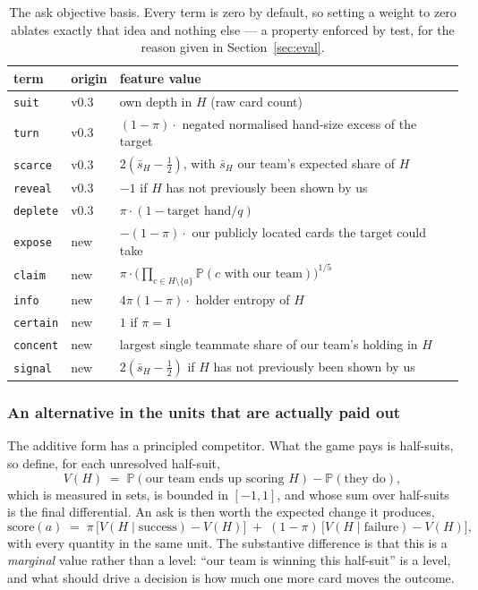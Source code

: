 \documentclass[11pt,letterpaper]{article}
\newcommand{\Prob}{\ensuremath{\mathbb{P}}}
\begin{document}
\begin{table}[t]
\centering
\small
\begin{tabular}{llp{7.4cm}}
\toprule
term & origin & feature value \\
\midrule
\texttt{suit}    & v0.3 & own depth in $H$ (raw card count) \\
\texttt{turn}    & v0.3 & $(1-\pi) \cdot$ negated normalised hand-size excess of the target \\
\texttt{scarce}  & v0.3 & $2(\bar{s}_H - \tfrac12)$, with $\bar{s}_H$ our team's expected share of $H$ \\
\texttt{reveal}  & v0.3 & $-1$ if $H$ has not previously been shown by us \\
\texttt{deplete} & v0.3 & $\pi \cdot (1 - \text{target hand}/q)$ \\
\texttt{expose}  & new  & $-(1-\pi) \cdot$ our publicly located cards the target could take \\
\texttt{claim}   & new  & $\pi \cdot \big(\prod_{c \in H \setminus \{a\}}\Prob(\text{$c$ with our team})\big)^{1/5}$ \\
\texttt{info}    & new  & $4\pi(1-\pi) \cdot$ holder entropy of $H$ \\
\texttt{certain} & new  & $1$ if $\pi = 1$ \\
\texttt{concent} & new  & largest single teammate share of our team's holding in $H$ \\
\texttt{signal}  & new  & $2(\bar{s}_H - \tfrac12)$ if $H$ has not previously been shown by us \\
\bottomrule
\end{tabular}
\caption{The ask objective basis. Every term is zero by default, so setting a
weight to zero ablates exactly that idea and nothing else --- a property
enforced by test, for the reason given in Section~\ref{sec:eval}.}
\label{tab:terms}
\end{table}

\subsubsection{An alternative in the units that are actually paid out}

The additive form has a principled competitor. What the game pays is half-suits,
so define, for each unresolved half-suit,
\begin{equation}
V(H) \;=\; \Prob(\text{our team ends up scoring } H) - \Prob(\text{they do}),
\label{eq:hsvalue}
\end{equation}
which is measured in sets, is bounded in $[-1,1]$, and whose sum over half-suits
is the final differential. An ask is then worth the expected change it produces,
\begin{equation}
\text{score}(a) \;=\; \pi\,\big[V(H \mid \text{success}) - V(H)\big]
\;+\; (1-\pi)\,\big[V(H \mid \text{failure}) - V(H)\big],
\label{eq:valobjective}
\end{equation}
with every quantity in the same unit. The substantive difference is that this is
a \emph{marginal} value rather than a level: ``our team is winning this
half-suit'' is a level, and what should drive a decision is how much one more
card moves the outcome.
\end{document}
